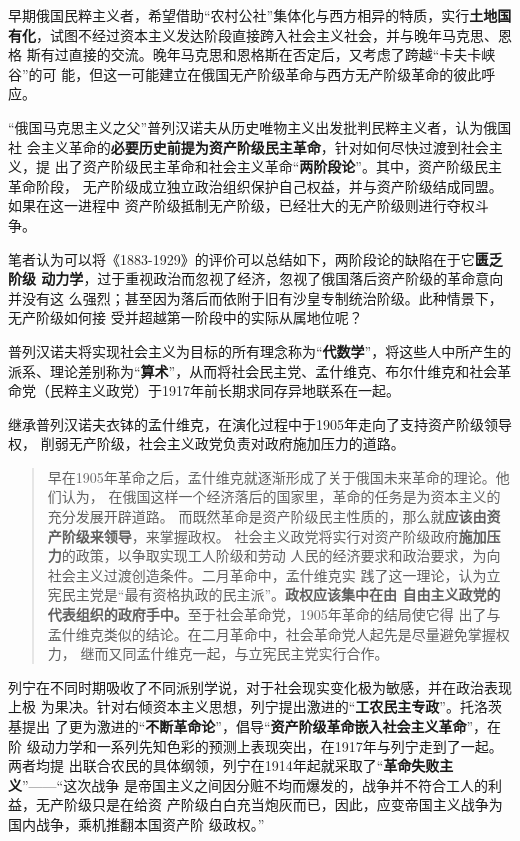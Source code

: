 
早期俄国民粹主义者，希望借助“农村公社”集体化与西方相异的特质，实行\textbf{土地国
  有化}，试图不经过资本主义发达阶段直接跨入社会主义社会，并与晚年马克思、恩格
斯有过直接的交流。晚年马克思和恩格斯在否定后，又考虑了跨越“卡夫卡峡谷”的可
能，但这一可能建立在俄国无产阶级革命与西方无产阶级革命的彼此呼
应。\cite{mamincui}

“俄国马克思主义之父”普列汉诺夫从历史唯物主义出发批判民粹主义者，认为俄国社
会主义革命的\textbf{必要历史前提为资产阶级民主革命}，针对如何尽快过渡到社会主义，提
出了资产阶级民主革命和社会主义革命“\textbf{两阶段论}”。其中，资产阶级民主革命阶段，
无产阶级成立独立政治组织保护自己权益，并与资产阶级结成同盟。如果在这一进程中
资产阶级抵制无产阶级，已经壮大的无产阶级则进行夺权斗争。

笔者认为可以将《1883-1929》的评价可以总结如下，两阶段论的缺陷在于它\textbf{匮乏阶级
  动力学}，过于重视政治而忽视了经济，忽视了俄国落后资产阶级的革命意向并没有这
么强烈；甚至因为落后而依附于旧有沙皇专制统治阶级。此种情景下，无产阶级如何接
受并超越第一阶段中的实际从属地位呢？

普列汉诺夫将实现社会主义为目标的所有理念称为“\textbf{代数学}”，将这些人中所产生的
派系、理论差别称为“\textbf{算术}”，从而将社会民主党、孟什维克、布尔什维克和社会革
命党（民粹主义政党）于1917年前长期求同存异地联系在一起。

继承普列汉诺夫衣钵的孟什维克，在演化过程中于1905年走向了支持资产阶级领导权，
削弱无产阶级，社会主义政党负责对政府施加压力的道路。
\begin{quotation}
  早在1905年革命之后，孟什维克就逐渐形成了关于俄国未来革命的理论。他们认为，
  在俄国这样一个经济落后的国家里，革命的任务是为资本主义的充分发展开辟道路。
  而既然革命是资产阶级民主性质的，那么就\textbf{应该由资产阶级来领导}，来掌握政权。
  社会主义政党将实行对资产阶级政府\textbf{施加压力}的政策，以争取实现工人阶级和劳动
  人民的经济要求和政治要求，为向社会主义过渡创造条件。二月革命中，孟什维克实
  践了这一理论，认为立宪民主党是“最有资格执政的民主派”。\textbf{政权应该集中在由
    自由主义政党的代表组织的政府手中。}至于社会革命党，1905年革命的结局使它得
  出了与孟什维克类似的结论。在二月革命中，社会革命党人起先是尽量避免掌握权力，
  继而又同孟什维克一起，与立宪民主党实行合作。\cite[38]{bigrussia}
\end{quotation}

列宁在不同时期吸收了不同派别学说，对于社会现实变化极为敏感，并在政治表现上极
为果决。针对右倾资本主义思想，列宁提出激进的“\textbf{工农民主专政}”。托洛茨基提出
了更为激进的“\textbf{不断革命论}”，倡导“\textbf{资产阶级革命嵌入社会主义革命}”，在阶
级动力学和一系列先知色彩的预测上表现突出，在1917年与列宁走到了一起。两者均提
出联合农民的具体纲领，列宁在1914年起就采取了“\textbf{革命失败主义}”——“这次战争
是帝国主义之间因分赃不均而爆发的，战争并不符合工人的利益，无产阶级只是在给资
产阶级白白充当炮灰而已，因此，应变帝国主义战争为国内战争，乘机推翻本国资产阶
级政权。”\cite{shibaizhuyi}

